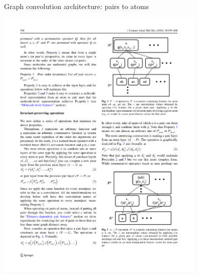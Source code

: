 \documentclass[xetex,compress]{beamer}
\begin{document}

\begin{frame}{Graph convolution architecture: pairs to atoms}
  \begin{center}
    \includegraphics[width=0.75\textwidth]{./figures/gc_fig2.pdf}
  \end{center}
\end{frame}
\end{document}
